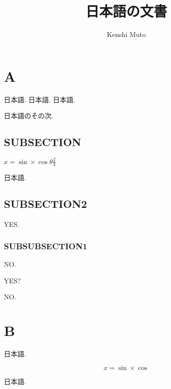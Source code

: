 \documentclass{jsarticle}
\title{日本語の文書}
\author{Kenshi Muto}
\begin{document}
\maketitle

\section{A}

日本語.
日本語.
日本語.

日本語のその次.

\subsection{SUBSECTION}

$x=\sin \times \cos \theta \frac{2}{3}$

日本語.

\subsection{SUBSECTION2}

YES.

\subsubsection{SUBSUBSECTION1}

NO.

YES?

\noindent
NO.

\section{B}

日本語.

\begin{equation}
x=\sin \times \cos
\end{equation}

日本語.
\end{document}
